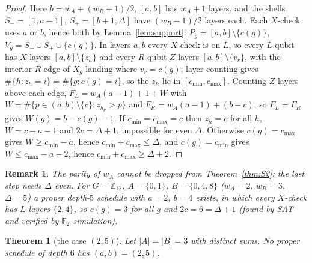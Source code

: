 \documentclass[reprint,twocolumn,superscriptaddress,nofootinbib]{revtex4-2}
\theoremstyle{plain}
\newtheorem{theorem}{Theorem}
\newtheorem*{remarkSI}{Remark}
\newcommand{\F}{\mathbb{F}_2}
\newcommand{\wA}{w_A}                  %
\newcommand{\wB}{w_B}
\begin{document}
\begin{proof}
Here $b=\wA+(\wB+1)/2$, $[a,b]$ has $\wA+1$ layers, and the shells
$S_-=[1,a-1]$, $S_+=[b+1,\Delta]$ have $(\wB-1)/2$ layers each. Each
$X$-check uses $a$ or $b$, hence both by Lemma~\ref{lem:support}:
$P_g=[a,b]\setminus\{c(g)\}$, $V_g=S_-\cup S_+\cup\{c(g)\}$. In layers $a,b$
every $X$-check is on $L$, so every $L$-qubit has $X$-layers
$[a,b]\setminus\{z_h\}$ and every $R$-qubit $Z$-layers
$[a,b]\setminus\{v_r\}$, with the interior $R$-edge of $X_g$ landing where
$v_r=c(g)$; layer counting gives $\#\{h:z_h=i\}=\#\{g:c(g)=i\}$, so the
$z_h$ lie in $[c_{\min},c_{\max}]$. Counting $Z$-layers above each edge,
$F_L=\wA(a-1)+1+W$ with $W=\#\{p\in(a,b)\setminus\{c\}:z_{h_p}>p\}$ and
$F_R=\wA(a-1)+(b-c)$, so $F_L=F_R$ gives $W(g)=b-c(g)-1$. If
$c_{\min}=c_{\max}=c$ then $z_h=c$ for all $h$, $W=c-a-1$ and
$2c=\Delta+1$, impossible for even $\Delta$. Otherwise $c(g)=c_{\max}$
gives $W\ge c_{\min}-a$, hence $c_{\min}+c_{\max}\le\Delta$, and
$c(g)=c_{\min}$ gives $W\le c_{\max}-a-2$, hence
$c_{\min}+c_{\max}\ge\Delta+2$.
\end{proof}

\begin{remarkSI}
The parity of $\wA$ cannot be dropped from Theorem~\ref{thm:S2}: the last
step needs $\Delta$ even. For $G=\mathbb{Z}_{12}$, $A=\{0,1\}$,
$B=\{0,4,8\}$ ($\wA=2$, $\wB=3$, $\Delta=5$) a proper depth-$5$ schedule
with $a=2$, $b=4$ exists, in which every $X$-check has $L$-layers $\{2,4\}$,
so $c(g)=3$ for all $g$ and $2c=6=\Delta+1$ (found by SAT and verified by
$\F$ simulation).
\end{remarkSI}

\begin{theorem}[the case $(2,5)$]
\label{thm:S3}
Let $|A|=|B|=3$ with distinct sums. No proper schedule of depth $6$ has
$(a,b)=(2,5)$.
\end{theorem}
\end{document}
